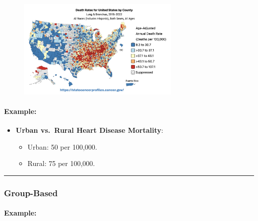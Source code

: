 \documentclass[
  letterpaper,
  DIV=11,
  numbers=noendperiod]{scrartcl}
\let\oldparagraph\paragraph
\renewcommand{\paragraph}[1]{\oldparagraph{#1}\mbox{}}
\providecommand{\tightlist}{%
  \setlength{\itemsep}{0pt}\setlength{\parskip}{0pt}}\usepackage{longtable,booktabs,array}
\begin{document}
\begin{figure}

{\centering \includegraphics[width=0.7\textwidth,height=\textheight]{week2_files/imgs/placeBased.jpg}

}

\end{figure}

\hypertarget{example}{%
\paragraph{Example:}\label{example}}

\begin{itemize}
\tightlist
\item
  \textbf{Urban vs.~Rural Heart Disease Mortality}:

  \begin{itemize}
  \tightlist
  \item
    Urban: 50 per 100,000.\\
  \item
    Rural: 75 per 100,000.
  \end{itemize}
\end{itemize}

\begin{center}\rule{0.5\linewidth}{0.5pt}\end{center}

\hypertarget{group-based}{%
\subsubsection{\texorpdfstring{{\textbf{Group-Based}}}{Group-Based}}\label{group-based}}

\hypertarget{example-1}{%
\paragraph{Example:}\label{example-1}}
\end{document}
